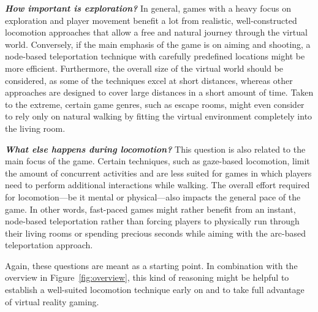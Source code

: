 \textbf{\textit{How important is exploration?}} In general, games with a heavy focus on exploration and player movement benefit a lot from realistic, well-constructed locomotion approaches that allow a free and natural journey through the virtual world. Conversely, if the main emphasis of the game is on aiming and shooting, a node-based teleportation technique with carefully predefined locations might be more efficient. Furthermore, the overall size of the virtual world should be considered, as some of the techniques excel at short distances, whereas other approaches are designed to cover large distances in a short amount of time. Taken to the extreme, certain game genres, such as escape rooms, might even consider to rely only on natural walking by fitting the virtual environment completely into the living room.


\textbf{\textit{What else happens during locomotion?}} This question is also related to the main focus of the game. Certain techniques, such as gaze-based locomotion, limit the amount of concurrent activities and are less suited for games in which players need to perform additional interactions while walking. The overall effort required for locomotion---be it mental or physical---also impacts the general pace of the game. In other words, fast-paced games might rather benefit from an instant, node-based teleportation rather than forcing players to physically run through their living rooms or spending precious seconds while aiming with the arc-based teleportation approach.


Again, these questions are meant as a starting point. In combination with the overview in Figure~\ref{fig:overview}, this kind of reasoning might be helpful to establish a well-suited locomotion technique early on and to take full advantage of virtual reality gaming.


